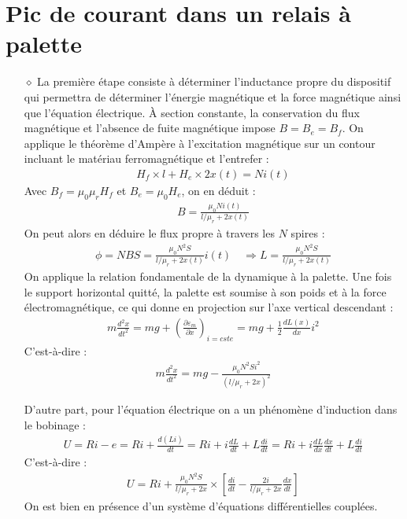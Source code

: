 \documentclass{report}
\begin{document}
\section*{Pic de courant dans un relais à palette}

\begin{itemize}
	
	\item[$\diamond$] La première étape consiste à déterminer l'inductance propre du dispositif qui permettra de déterminer l'énergie magnétique et la force magnétique ainsi que l'équation électrique. À section constante, la conservation du flux magnétique et l'absence de fuite magnétique impose $B=B_e=B_f$. On applique le théorème d'Ampère à l'excitation magnétique sur un contour incluant le matériau ferromagnétique et l'entrefer :
	\begin{align*}
		H_f\times l+H_e\times2x(t)=Ni(t)
	\end{align*}
Avec $B_f=\mu_0\mu_rH_f$ et $B_e=\mu_0H_e$, on en déduit :
\begin{align*}
	B = \frac{\mu_0Ni(t)}{l/\mu_r+2x(t)}
\end{align*}
	On peut alors en déduire le flux propre à travers les $N$ spires : 
\begin{align*}
	\phi = NBS = \frac{\mu_0N^2S}{l/\mu_r+2x(t)}i(t) \quad\Rightarrow L = \frac{\mu_0N^2S}{l/\mu_r+2x(t)}
\end{align*}	
	On applique la relation fondamentale de la dynamique à la palette. Une fois le support horizontal quitté, la palette est soumise à son poids et à la force électromagnétique, ce qui donne en projection sur l'axe vertical descendant :
\begin{align*}
	m\frac{d^2x}{dt^2}=mg+\left(\frac{\partial \varepsilon_m}{\partial x} \right)_{i=cste}=mg+\frac{1}{2}\frac{dL(x)}{dx}i^2 
\end{align*}	
	C'est-à-dire :
	\begin{align*}
		m\frac{d^2x}{dt^2}=mg- \frac{\mu_0N^2Si^2}{(l/\mu_r+2x)^2}
	\end{align*}
	
D'autre part, pour l'équation électrique on a un phénomène d'induction dans le bobinage :
\begin{align*}
	U=Ri-e=Ri+\frac{d(Li)}{dt}=Ri+i\frac{dL}{dt}+L\frac{di}{dt}=Ri+i\frac{dL}{dx}\frac{dx}{dt}+L\frac{di}{dt}
\end{align*} 
C'est-à-dire :
\begin{align*}
	U=Ri+\frac{\mu_0N^2S}{l/\mu_r+2x}\times\left[\frac{di}{dt} - \frac{2i}{l/\mu_r+2x}\frac{dx}{dt}\right] 
\end{align*}
On est bien en présence d'un système d’équations différentielles couplées.


\end{itemize}
\end{document}
